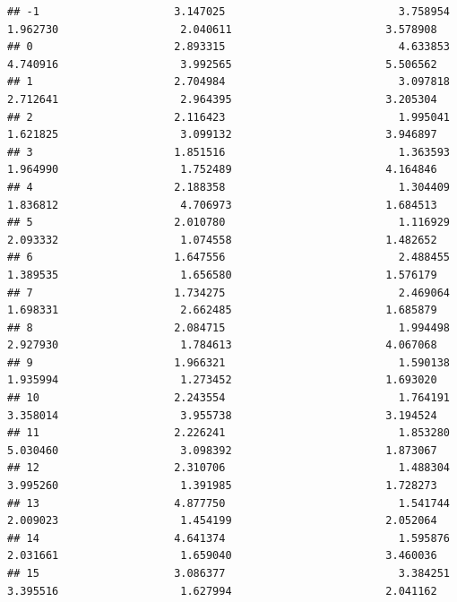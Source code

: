 \documentclass[
]{article}
\begin{document}
\begin{verbatim}
## -1                     3.147025                           3.758954                      1.962730                   2.040611                        3.578908
## 0                      2.893315                           4.633853                      4.740916                   3.992565                        5.506562
## 1                      2.704984                           3.097818                      2.712641                   2.964395                        3.205304
## 2                      2.116423                           1.995041                      1.621825                   3.099132                        3.946897
## 3                      1.851516                           1.363593                      1.964990                   1.752489                        4.164846
## 4                      2.188358                           1.304409                      1.836812                   4.706973                        1.684513
## 5                      2.010780                           1.116929                      2.093332                   1.074558                        1.482652
## 6                      1.647556                           2.488455                      1.389535                   1.656580                        1.576179
## 7                      1.734275                           2.469064                      1.698331                   2.662485                        1.685879
## 8                      2.084715                           1.994498                      2.927930                   1.784613                        4.067068
## 9                      1.966321                           1.590138                      1.935994                   1.273452                        1.693020
## 10                     2.243554                           1.764191                      3.358014                   3.955738                        3.194524
## 11                     2.226241                           1.853280                      5.030460                   3.098392                        1.873067
## 12                     2.310706                           1.488304                      3.995260                   1.391985                        1.728273
## 13                     4.877750                           1.541744                      2.009023                   1.454199                        2.052064
## 14                     4.641374                           1.595876                      2.031661                   1.659040                        3.460036
## 15                     3.086377                           3.384251                      3.395516                   1.627994                        2.041162

\end{verbatim}
\end{document}

